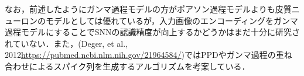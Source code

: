 なお，前述したようにガンマ過程モデルの方がポアソン過程モデルよりも皮質ニューロンのモデルとしては優れているが，入力画像のエンコーディングをガンマ過程モデルにすることでSNNの認識精度が向上するかどうかはまだ十分に研究されていない．また，(Deger, et al., 2012\url{https://pubmed.ncbi.nlm.nih.gov/21964584/})ではPPDやガンマ過程の重ね合わせによるスパイク列を生成するアルゴリズムを考案している．
